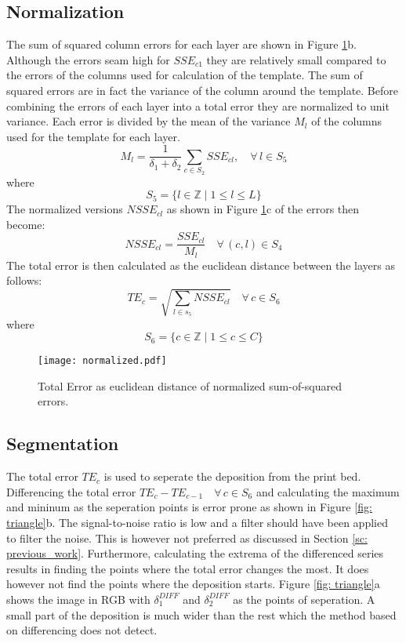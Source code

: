 \subsection*{Normalization} \label{ssc: normalization}
The sum of squared column errors for each layer are shown in Figure \ref{fig: normalized}b. Although the errors seam high for $SSE_{c1}$ they are relatively small compared to the errors of the columns used for calculation of the template. The sum of squared errors are in fact the variance of the column around the template. Before combining the errors of each layer into a total error they are normalized to unit variance. Each error is divided by the mean of the variance $M_l$ of the columns used for the template for each layer.
\begin{equation}
M_l = \frac{1}{\delta_1+\delta_2}  \sum_{c \in S_2}  SSE_{cl}, \quad \forall \, l \in S_5
\end{equation}
where
\begin{equation}
S_5 = \{l \in \mathbb {Z} \mid 1 \leq l \leq L \}  
\end{equation}
The normalized versions $NSSE_{cl}$ as shown in Figure \ref{fig: normalized}c of the errors then become:
\begin{equation}
NSSE_{cl} = \frac{SSE_{cl}}{M_l} \quad \forall \, (c,l) \in S_4
\end{equation}
The total error is then calculated as the euclidean distance between the layers as follows:
\begin{equation}
TE_{c} = \sqrt{ \sum_{l \in s_5} NSSE_{cl} } \quad \forall \, c \in S_6
\end{equation}
where 
\begin{equation}
S_6 = \{c \in \mathbb {Z} \mid 1 \leq c \leq C \}  
\end{equation}

\begin{figure}[!ht]
\centering
\texttt{[image: normalized.pdf]} 
\caption{Total Error as euclidean distance of normalized sum-of-squared errors.}
\label{fig: normalized}
\end{figure}

\subsection*{Segmentation}\label{sc: triangle}
The total error $TE_c$ is used to seperate the deposition from the print bed. Differencing the total error $TE_c - TE_{c-1} \quad \forall \, c \in S_6$ and calculating the maximum and mininum as the seperation points is error prone as shown in Figure \ref{fig: triangle}b. The signal-to-noise ratio is low and a filter should have been applied to filter the noise. This is however not preferred as discussed in Section \ref{sc: previous_work}. Furthermore, calculating the extrema of the differenced series results in finding the points where the total error changes the most. It does however not find the points where the deposition starts. Figure \ref{fig: triangle}a shows the image in RGB with $\delta^{DIFF}_1$ and $\delta^{DIFF}_2$ as the points of seperation. A small part of the deposition is much wider than the rest which the method based on differencing does not detect. 

